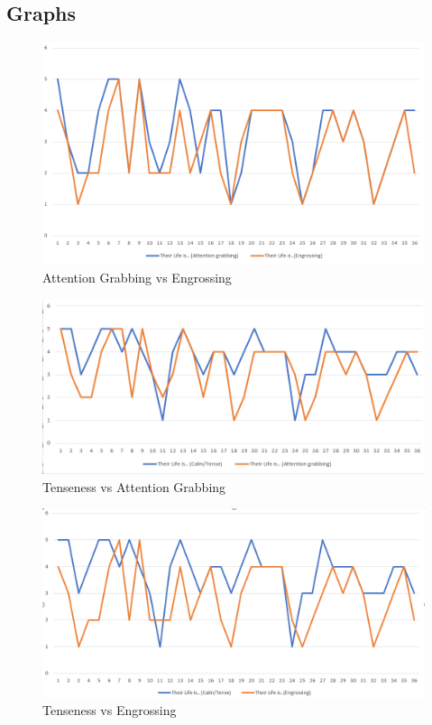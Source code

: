 \documentclass[12pt]{article}
\begin{document}
\subsection{Graphs}
\begin{figure}[h]
\caption{Attention Grabbing vs Engrossing}
\label{tab:AttentionGrabbingvsEngrossing}
 \centering
 \includegraphics[scale=0.75]{Attention Grabbing vs Engrossing.png}
\end{figure}


\begin{figure}[h]
\caption{Tenseness vs Attention Grabbing}
\label{tab:TensenessvsAttentionGrabbing}
 \centering
 \includegraphics[scale=0.75]{Tenseness vs Attention Grabbing.png}
\end{figure}

\pagebreak

\begin{figure}[h]
\caption{Tenseness vs Engrossing}
\label{tab:TensenessvsEngrossing}
 \centering
 \includegraphics[scale=0.75]{Tenseness vs Engrossing.png}
\end{figure}
\end{document}
